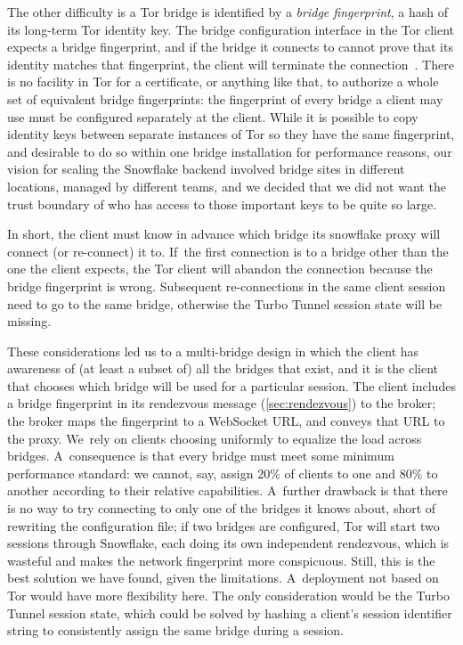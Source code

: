 \documentclass[letterpaper,twocolumn]{article}
\newcommand{\firstterm}[1]{\textit{#1}}
\begin{document}
The other difficulty is a Tor bridge is identified
by a \firstterm{bridge fingerprint},
a hash of its long-term Tor identity key.
The bridge configuration interface in the Tor client
expects a bridge fingerprint,
and if the bridge it connects to cannot prove that
its identity matches that fingerprint,
the client will terminate the connection~\cite[\S 5.1.2]{tor-spec}.
There is no facility in Tor for a certificate,
or anything like that,
to authorize a whole set of equivalent bridge fingerprints:
the fingerprint of every bridge a client may use
must be configured separately at the client.
While it is possible to copy identity keys between
separate instances of Tor so they have the same fingerprint,
and desirable to do so within one bridge installation for performance reasons,
our vision for scaling the Snowflake backend
involved bridge sites in different locations,
managed by different teams,
and we decided that we did not want the trust boundary
of who has access to those important keys to be quite so large.

In short, the client must know in advance which bridge
its snowflake proxy will connect (or re-connect) it to.
If~the first connection is to a bridge other than the one the client expects,
the Tor client will abandon the connection because the bridge fingerprint is wrong.
Subsequent re-connections in the same client session
need to go to the same bridge,
otherwise the Turbo Tunnel session state will be missing.

These considerations led us to a multi-bridge design
in which the client has awareness of (at least a subset of)
all the bridges that exist,
and it is the client that chooses which bridge will be used
for a particular session.
The client includes a bridge fingerprint
in its rendezvous message (\autoref{sec:rendezvous}) to the broker;
the broker maps the fingerprint to a WebSocket URL,
and conveys that URL to the proxy.
We~rely on clients choosing uniformly
to equalize the load across bridges.
A~consequence is that
every bridge must meet some minimum performance standard:
we cannot, say,
assign 20\% of clients to one and 80\% to another
according to their relative capabilities.
A~further drawback is that there is no way to try connecting
to only one of the bridges it knows about,
short of rewriting the configuration file;
if two bridges are configured, Tor will start two sessions through Snowflake,
each doing its own independent rendezvous,
which is wasteful and makes the network fingerprint more conspicuous.
Still, this is the best solution we have found, given the limitations.
A~deployment not based on Tor would have more flexibility here.
The only consideration would be the Turbo Tunnel session state,
which could be solved by hashing a client's session identifier string
to consistently assign the same bridge during a session.
\end{document}
